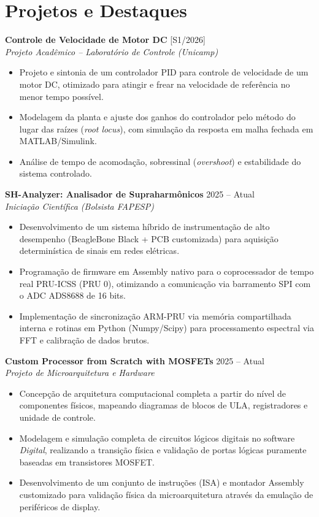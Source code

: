 \documentclass[a4paper,10pt]{article}
\newcommand{\entry}[4]{
  \noindent\textbf{#1} \hfill #2 \\
  \noindent\textit{#3} \hfill \textit{#4} \\
  \vspace{2pt}
}
\begin{document}
\section*{Projetos e Destaques}

\entry{Controle de Velocidade de Motor DC}{[S1/2026]}{Projeto Acadêmico -- Laboratório de Controle (Unicamp)}{}
\vspace{-1.6em}
\begin{itemize}
\setlength\itemsep{0em}
\item Projeto e sintonia de um controlador PID para controle de velocidade de um motor DC, otimizado para atingir e frear na velocidade de referência no menor tempo possível.
\item Modelagem da planta e ajuste dos ganhos do controlador pelo método do lugar das raízes (\textit{root locus}), com simulação da resposta em malha fechada em MATLAB/Simulink.
\item Análise de tempo de acomodação, sobressinal (\textit{overshoot}) e estabilidade do sistema controlado.
\end{itemize}

\entry{SH-Analyzer: Analisador de Supraharmônicos}{2025 -- Atual}{Iniciação Científica (Bolsista FAPESP)}{}
\vspace{-1.6em}
\begin{itemize}
\setlength\itemsep{0em}
\item Desenvolvimento de um sistema híbrido de instrumentação de alto desempenho (BeagleBone Black + PCB customizada) para aquisição determinística de sinais em redes elétricas.
\item Programação de firmware em Assembly nativo para o coprocessador de tempo real PRU-ICSS (PRU 0), otimizando a comunicação via barramento SPI com o ADC ADS8688 de 16 bits.
\item Implementação de sincronização ARM-PRU via memória compartilhada interna e rotinas em Python (Numpy/Scipy) para processamento espectral via FFT e calibração de dados brutos.
\end{itemize}

\entry{Custom Processor from Scratch with MOSFETs}{2025 -- Atual}{Projeto de Microarquitetura e Hardware}{}
\vspace{-1.6em}
\begin{itemize}
\setlength\itemsep{0em}
\item Concepção de arquitetura computacional completa a partir do nível de componentes físicos, mapeando diagramas de blocos de ULA, registradores e unidade de controle.
\item Modelagem e simulação completa de circuitos lógicos digitais no software \textit{Digital}, realizando a transição física e validação de portas lógicas puramente baseadas em transistores MOSFET.
\item Desenvolvimento de um conjunto de instruções (ISA) e montador Assembly customizado para validação física da microarquitetura através da emulação de periféricos de display.
\end{itemize}
\end{document}

